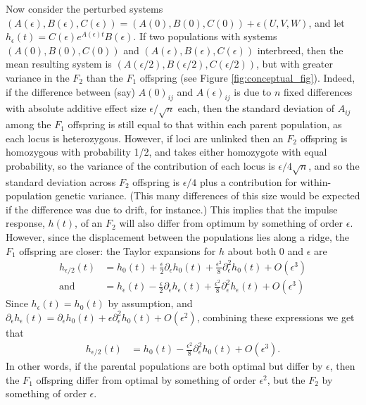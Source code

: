 \documentclass{article}
\newcommand{\1}{\mathbbm{1}}
\begin{document}
Now consider the perturbed systems $(A(\epsilon), B(\epsilon), C(\epsilon)) = (A(0), B(0), C(0)) + \epsilon (U, V, W)$,
and let $h_\epsilon(t) = C(\epsilon) e^{A(\epsilon) t} B(\epsilon)$.
If two populations with systems $(A(0), B(0), C(0))$ and $(A(\epsilon), B(\epsilon), C(\epsilon))$ interbreed,
then the mean resulting system is $(A({\epsilon/2}), B({\epsilon/2}), C({\epsilon/2}))$,
but with greater variance in the $F_2$ than the $F_1$ offspring (see Figure \ref{fig:conceptual_fig}).
Indeed, if the difference between (say) $A(0)_{ij}$ and $A(\epsilon)_{ij}$
is due to $n$ fixed differences with absolute additive effect size $\epsilon/\sqrt{n}$ each,
then the standard deviation of $A_{ij}$ among the $F_1$ offspring is still equal to that
within each parent population, as each locus is heterozygous.
However, if loci are unlinked then an $F_2$ offspring is homozygous with probability 1/2,
and takes either homozygote with equal probability,
so the variance of the contribution of each locus is $\epsilon/4\sqrt{n}$,
and so the standard deviation across $F_2$ offspring is $\epsilon/4$
plus a contribution for within-population genetic variance.
(This many differences of this size would be expected if the difference was due to drift, for instance.)
This implies that the impulse response, $h(t)$, of an $F_2$ will also differ from optimum
by something of order $\epsilon$.
However, since the displacement between the populations lies along a ridge,
the $F_1$ offspring are closer:
the Taylor expansions for $h$ about both 0 and $\epsilon$ are
\begin{align}
    h_{\epsilon/2}(t)
    &= h_0(t)
        + \frac{\epsilon}{2} \partial_\epsilon h_0(t)
        + \frac{\epsilon^2}{8} \partial_\epsilon^2 h_0(t)
        + O(\epsilon^3) \\
    \text{and} \quad
    &= h_\epsilon(t)
        - \frac{\epsilon}{2} \partial_\epsilon h_\epsilon(t)
        + \frac{\epsilon^2}{8} \partial_\epsilon^2 h_\epsilon(t)
        + O(\epsilon^3)
\end{align}
Since $h_\epsilon(t) = h_0(t)$ by assumption,
and $\partial_\epsilon h_\epsilon(t) = \partial_\epsilon h_0(t) + \epsilon \partial_\epsilon^2 h_0(t) + O(\epsilon^2)$,
combining these expressions we get that
\begin{align}
    h_{\epsilon/2}(t)
    &= h_0(t)
        - \frac{\epsilon^2}{8} \partial_\epsilon^2 h_0(t)
        + O(\epsilon^3) .
\end{align}
In other words, if the parental populations are both optimal but differ by $\epsilon$,
then the $F_1$ offspring differ from optimal by something of order $\epsilon^2$,
but the $F_2$ by something of order $\epsilon$.
\end{document}
